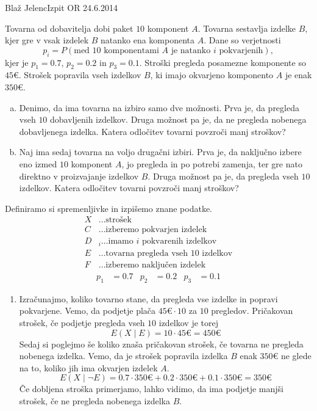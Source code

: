\begin{naloga}{Blaž Jelenc}{Izpit OR 24.6.2014}
\begin{vprasanje}
Tovarna od dobavitelja dobi paket $10$ komponent $A$.
Tovarna sestavlja izdelke $B$,
kjer gre v vsak izdelek $B$ natanko ena komponenta $A$.
Dane so verjetnosti
$$
p_i = P(\text{med $10$ komponentami $A$ je natanko $i$ pokvarjenih}),
$$
kjer je $p_1 = 0.7$, $p_2 = 0.2$ in $p_3 = 0.1$.
Stroški pregleda posamezne komponente so $45 €$.
Strošek popravila vseh izdelkov $B$, ki imajo okvarjeno komponento $A$
je enak $350 €$.
\begin{enumerate}[(a)]
\item Denimo, da ima tovarna na izbiro samo dve možnosti.
Prva je, da pregleda vseh $10$ dobavljenih izdelkov.
Druga možnost pa je, da ne pregleda nobenega dobavljenega izdelka.
Katera odločitev tovarni povzroči manj stroškov?

\item Naj ima sedaj tovarna na voljo drugačni izbiri.
Prva je, da naključno izbere eno izmed $10$ komponent $A$,
jo pregleda in po potrebi zamenja,
ter gre nato direktno v proizvajanje izdelkov $B$.
Druga možnost pa je, da pregleda vseh $10$ izdelkov.
Katera odločitev tovarni povzroči manj stroškov?
\end{enumerate}
\end{vprasanje}
\begin{odgovor}
    Definiramo si spremenljivke in izpišemo znane podatke.
    \begin{align*}
    X &\dots \text{strošek}\\
    C &\dots \text{izberemo pokvarjen izdelek}\\
    D&_i \dots \text{imamo $i$ pokvarenih izdelkov}\\
    E &\dots \text{tovarna pregleda vseh } 10 \text{ izdelkov}\\
    F &\dots \text{izberemo naključen izdelek}
    \end{align*}
    \begin{align*}
    p_1 &= 0.7 & p_2 &= 0.2 & p_3 &= 0.1
    \end{align*}
    
    \begin{enumerate}
    \item Izračunajmo, koliko tovarno stane, da pregleda vse izdelke in popravi pokvarjene. Vemo, da podjetje plača $45 €\cdot 10$ za $10$ pregledov.
    Pričakovan strošek, če podjetje pregleda vseh $10$ izdelkov je torej
    $$
    E(X\mid E) = 10 \cdot 45 € = 450 €
    $$
    Sedaj si poglejmo še koliko znaša pričakovan strošek, če tovarna ne pregleda nobenega izdelka. Vemo, da je strošek popravila izdelka $B$ enak $350 €$ ne glede na to, koliko jih ima okvarjen izdelek $A$.
    $$
    E(X\mid \neg E) = 0.7 \cdot 350 € + 0.2 \cdot 350 € + 0.1 \cdot 350 € = 350 €
    $$
    Če dobljena stroška primerjamo, lahko vidimo, da ima podjetje manjši strošek, če ne pregleda nobenega izdelka $B$.
    

\end{enumerate}
\end{odgovor}
\end{naloga}
